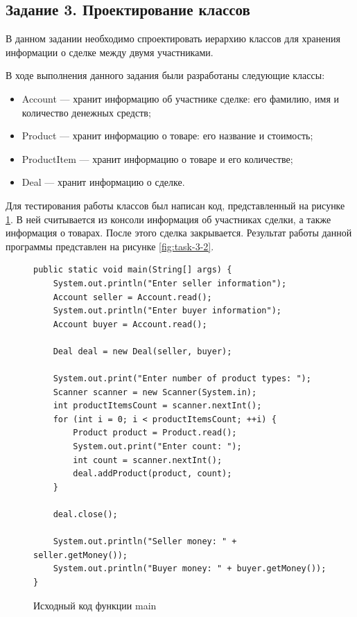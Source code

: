 \documentclass[a4paper, 14pt]{extarticle}
\begin{document}
\subsection*{Задание 3. Проектирование классов}

В данном задании необходимо спроектировать иерархию классов для хранения
информации о сделке между двумя участниками.

В ходе выполнения данного задания были разработаны следующие классы:
\begin{itemize}
  \item Account --- хранит информацию об участнике сделке: его фамилию, имя и
  количество денежных средств;
  \item Product --- хранит информацию о товаре: его название и стоимость;
  \item ProductItem --- хранит информацию о товаре и его количестве;
  \item Deal --- хранит информацию о сделке.
\end{itemize}

Для тестирования работы классов был написан код, представленный на рисунке
\ref{fig:task-3-1}. В ней считывается из консоли информация об участниках
сделки, а также информация о товарах. После этого сделка закрывается. Результат
работы данной программы представлен на рисунке \ref{fig:task-3-2}.

\begin{figure}[H]
  \centering
  \begin{verbatim}
public static void main(String[] args) {
    System.out.println("Enter seller information");
    Account seller = Account.read();
    System.out.println("Enter buyer information");
    Account buyer = Account.read();

    Deal deal = new Deal(seller, buyer);

    System.out.print("Enter number of product types: ");
    Scanner scanner = new Scanner(System.in);
    int productItemsCount = scanner.nextInt();
    for (int i = 0; i < productItemsCount; ++i) {
        Product product = Product.read();
        System.out.print("Enter count: ");
        int count = scanner.nextInt();
        deal.addProduct(product, count);
    }

    deal.close();

    System.out.println("Seller money: " + seller.getMoney());
    System.out.println("Buyer money: " + buyer.getMoney());
}
  \end{verbatim}
  \caption{Исходный код функции main}
  \label{fig:task-3-1}
\end{figure}
\end{document}
